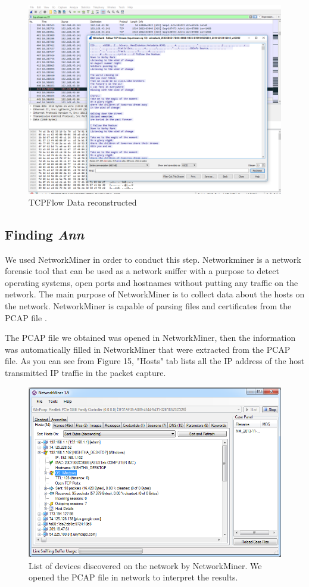\documentclass{article}
\begin{document}
\begin{figure}[H]
	\begin{center}
		\includegraphics[width=0.6
\textwidth]{TCPFLOW2.png}
	\end{center}
	\caption{TCPFlow Data reconstructed}
	\label{fig:Prd}
\end{figure}

\subsection{Finding \textit{{Ann}}}
We used NetworkMiner in order to conduct this step. Networkminer is a network forensic tool that can be used as a network sniffer with a purpose to detect operating systems, open ports and hostnames without putting any traffic on the network. The main purpose of NetworkMiner is to collect data about the hosts on the network. NetworkMiner is capable of parsing files and certificates from the PCAP file \cite{crenshaw2008osfuscate}.

The PCAP file we obtained was opened in NetworkMiner, then the information was automatically filled in NetworkMiner that were extracted from the PCAP file. As you can see from Figure 15, "Hosts" tab lists all the IP address of the host transmitted IP traffic in the packet capture. 
\begin{figure}[H]
	\begin{center}
		\includegraphics[width=0.6
\textwidth]{FINDINGANN1.png}
	\end{center}
	\caption{List of devices discovered on the network by NetworkMiner. We opened the PCAP file in network to interpret the results. }
	\label{fig:Prd}
\end{figure}
\end{document}
